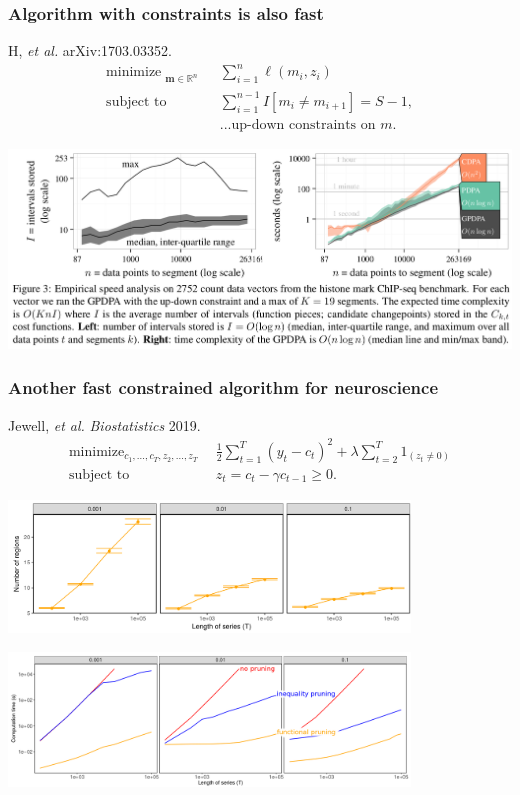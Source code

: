 \documentclass{beamer}
\DeclareMathOperator*{\minimize}{minimize}
\newcommand{\RR}{\mathbb R}
\begin{document}
\begin{frame}
  \frametitle{Algorithm with constraints is also fast}
  H, {\it et al.} arXiv:1703.03352.
\vskip -0.5cm
  \begin{align*}
    \minimize_{\substack{
  \mathbf m\in\RR^{n}
  }} &\ \ 
    \sum_{i=1}^n \ell( m_i,  z_i) 
\\
      \text{subject to} &\ \ {{\sum_{i=1}^{n-1} I[m_i\neq m_{i+1}]}=S-1,}
  \nonumber\\
  &\ \ \text{...up-down constraints on $m$.}
  \nonumber 
\end{align*}

\includegraphics[width=\textwidth]{screenshot-GPDPA-intervals}

\end{frame}


\begin{frame}
  \frametitle{Another fast constrained algorithm for neuroscience}
  Jewell, {\it et al.} {\it Biostatistics} 2019.
\vskip -0.5cm
\begin{align*}
    \minimize_{c_1,\dots,c_T, z_2, \dots, z_T} &\ \ 
    \frac 1 2 \sum_{t=1}^T (y_t-c_t)^2  + 
\lambda\sum_{t=2}^{T} 1_{(z_t\neq 0)}
\\
      \text{subject to} &\ \ z_t = c_t - \gamma c_{t-1} \geq 0.
  \nonumber 
\end{align*}

\centering

\includegraphics[width=0.8\textwidth]{screenshot-jewell-intervals}

\includegraphics[width=0.8\textwidth]{screenshot-jewell-timings-labels}
  
\end{frame}
\end{document}
